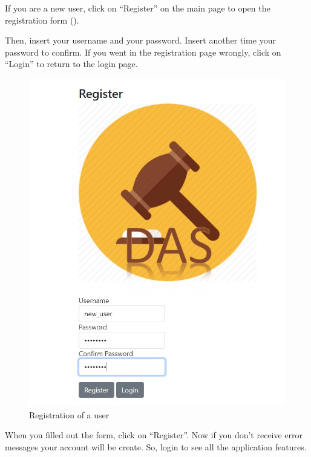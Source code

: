 If you are a new user, click on ``Register'' on the main page to open the
registration form ().

Then, insert your username and your password. Insert another time your password
to confirm. If you went in the registration page wrongly, click on ``Login'' to
return to the login page.

\begin{figure}[htb]
	\centering
	\includegraphics[width=\textwidth]{img/registration.jpg}
	\caption{Registration of a user}\label{fig:registration}
\end{figure}

When you filled out the form, click on ``Register''. Now if you don’t receive
error messages your account will be create. So, login to see all the application
features.

